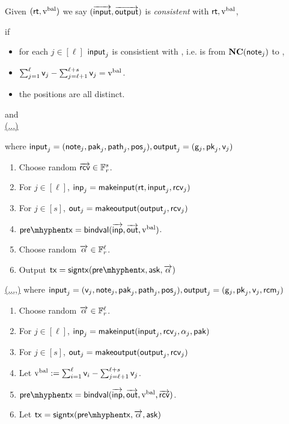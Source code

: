 \documentclass[11pt]{article}
\numberwithin{equation}{section} %
\numberwithin{figure}{section} %
\newcommand{\inp}{\ensuremath{\mathsf{inp}}\xspace}
\newcommand{\inps}{\ensuremath{\overrightarrow{\mathsf{inp}}}\xspace}
\newcommand{\outs}{\ensuremath{\overrightarrow{\mathsf{out}}}\xspace}
\newcommand{\out}{\ensuremath{\mathsf{out}}\xspace}
\begin{document}
Given $(\mathsf{rt},\mathrm{v^{bal}})$ we say $(\overrightarrow{\mathsf{input}},\overrightarrow{\mathsf{output}})$ is \emph{consistent} with $\mathsf{rt},\mathrm{v^{bal}}$,

if
\begin{itemize}
 \item for each $j\in [\ell]$ $\mathsf{input}_j$ is consistient with \rt, i.e. \jof{\pak} is from $\mathbf{NC}(\mathsf{note}_j)$ to \rt,
 \item $\sum_{j=1}^{\ell} \mathsf{v}_j-\sum_{j=\ell+1}^{\ell+s} \mathsf{v}_j=\mathrm{v^{bal}}$.
 \item the positions  are all distinct.
\end{itemize}


and \\
\noindent
\underline{\makerandomizedtx(\rt,\vbal,,\outputs)}

\noindent
where $\mathsf{input}_j = (\mathsf{note}_j,\mathsf{pak}_j,\mathsf{path}_j,\mathsf{pos}_j), \mathsf{output}_j =(\mathsf{g}_j,\mathsf{pk}_j,\mathsf{v}_j)$
\begin{enumerate}
 \item Choose random $\overrightarrow{\mathsf{rcv}}\in {\mathbb F}_r^s$.
 \item For $j\in [\ell]$, $\inp_j = \makeinput(\rt,\input_j,\rcv_j)$
 \item For $j\in [s]$, $\out_j=\makeoutput(\output_j,\rcv_j)$
 \item $\pretx = \bindvaltx(\inps,\outs,\vbal)$.
 \item Choose random $\overrightarrow{\mathsf{\alpha}}\in {\mathbb F}_r^{\ell}$.
 \item Output $\tx = \signtx{\pretx,\ask,\alphas}$
\end{enumerate}

\noindent
\underline{\maketx(,\outputs,\rcvs,\ask,\pak)}
where $\mathsf{input}_j = (\mathsf{v}_j,\mathsf{note}_j,\mathsf{pak}_j,\mathsf{path}_j,\mathsf{pos}_j), \mathsf{output}_j =(\mathsf{g}_j,\mathsf{pk}_j,\mathsf{v}_j,\mathsf{rcm}_j)$
\begin{enumerate}
\item Choose random $\overrightarrow{\mathsf{\alpha}}\in{\mathbb F}_r^{\ell}$.
 \item For $j\in [\ell]$, $\inp_j = \makeinput(\input_j,\rcv_j,\alpha_j,\pak)$
 \item For $j\in [s]$, $\out_j=\makeoutput(\output_j,\rcv_j)$
 \item Let $\mathrm{v^{bal}} := \sum_{i=1}^\ell\mathsf{v}_i - \sum_{j=\ell+1}^{\ell+s}\mathsf{v}_j$.
 \item $\pretx = \bindvaltx(\inps,\outs,\vbal,\rcvs)$.
 \item Let $\tx = \signtx{\pretx,\alphas,\ask}$
\end{enumerate}

\noindent
\underline{\verifytx{\ledger}{\tx}}
\end{document}
